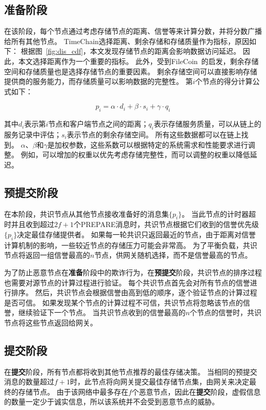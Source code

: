 \subsection{准备阶段}
在该阶段，每个节点通过考虑存储节点的距离、信誉等来计算分数，并将分数广播给所有其他节点。
TimeChain选择距离、剩余存储和存储质量作为指标，原因如下：
根据图~\autoref{fig:dis_cdf}，本文发现存储节点的距离会影响数据访问延迟。
因此，本文选择距离作为一个重要的指标。
此外，受到FileCoin~\cite{bauer2022filecoin}的启发，剩余存储空间和存储质量也是选择存储节点的重要因素。
剩余存储空间可以直接影响存储提供商的服务能力，而存储质量可以影响数据的完整性。
第$i$个节点的得分计算公式如下：

\begin{equation} 
    \label{eq:score}
    p_i=\alpha\cdot d_i+\beta\cdot s_i+\gamma\cdot q_i
\end{equation}

其中$d_i$表示第$i$节点和客户端节点之间的距离；$q_i$表示存储服务质量，可以从链上的服务记录中评估；$s_i$表示节点的剩余存储空间。
所有这些数据都可以在链上找到。
$\alpha$、$\beta$和$\gamma$是加权参数，这些系数可以根据特定的系统需求和性能要求进行调整。
例如，可以增加的权重以优先考虑存储完整性，而可以调整的权重以降低延迟。

\subsection{预提交阶段}
在本阶段，共识节点从其他节点接收准备好的消息集$\{p_i\}$。
当此节点的计时器超时并且收到超过$2f+1$个PREPARE消息时，共识节点根据它们收到的信誉优先级$\{p_i\}$决定最佳存储提供者。
如果每一轮共识只返回最近的节点，由于距离对信誉计算机制的影响，一些较近节点的存储压力可能会非常高。
为了平衡负载，共识节点将返回一组信誉最高的$n$节点，供网关随机选择，而不是信誉最高的节点。

为了防止恶意节点在\textbf{准备}阶段中的欺诈行为，在\textbf{预提交}阶段，共识节点的排序过程也需要对源节点的计算过程进行验证。
每个共识节点首先会对所有节点的信誉进行排序。
然后，共识节点会根据信誉由高到低的顺序，逐个验证节点的计算过程是否可信。
如果发现某个节点的计算过程不可信，共识节点将忽略该节点的信誉，继续验证下一个节点。
当共识节点收到的信誉最高的$n$个节点的信誉时，共识节点将这些节点返回给网关。

\subsection{提交阶段}
在\textbf{提交}阶段，所有节点都将收到其他节点推荐的最佳存储决策。
当相同的预提交消息的数量超过$f+1$时，此节点将向网关提交最佳存储节点集，由网关来决定最终的存储节点。
由于该网络中最多存在$f$个恶意节点，因此在\textbf{提交}阶段，虚假信息的数量一定少于诚实信息，所以该系统并不会受到恶意节点的威胁。

